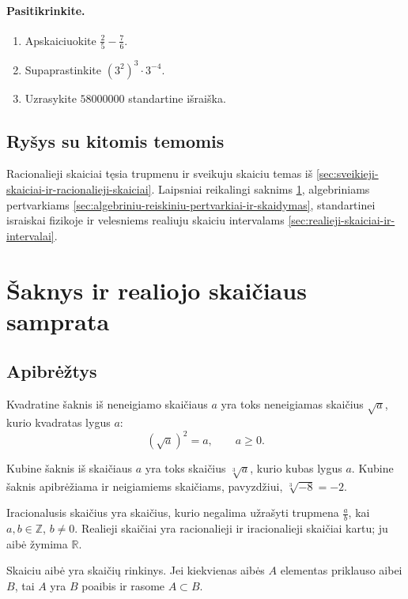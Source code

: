 \paragraph{Pasitikrinkite.}
\begin{enumerate}[label=\alph*)]
\item Apskaiciuokite $\frac25-\frac76$.
\item Supaprastinkite $(3^2)^3\cdot3^{-4}$.
\item Uzrasykite $58000000$ standartine išraiška.
\end{enumerate}

\subsection{Ryšys su kitomis temomis}
Racionalieji skaiciai tęsia trupmenu ir sveikuju skaiciu temas iš \ref{sec:sveikieji-skaiciai-ir-racionalieji-skaiciai}. Laipsniai reikalingi saknims \ref{sec:saknys-ir-realiojo-skaiciaus-samprata}, algebriniams pertvarkiams \ref{sec:algebriniu-reiskiniu-pertvarkiai-ir-skaidymas}, standartinei israiskai fizikoje ir velesniems realiuju skaiciu intervalams \ref{sec:realieji-skaiciai-ir-intervalai}.

\section{Šaknys ir realiojo skaičiaus samprata}\label{sec:saknys-ir-realiojo-skaiciaus-samprata}

\subsection{Apibrėžtys}
\begin{apibreztis}
Kvadratine šaknis iš neneigiamo skaičiaus $a$ yra toks neneigiamas skaičius $\sqrt a$, kurio kvadratas lygus $a$:
\[
(\sqrt a)^2=a,\qquad a\ge0.
\]
\end{apibreztis}
\begin{apibreztis}
Kubine šaknis iš skaičiaus $a$ yra toks skaičius $\sqrt[3]{a}$, kurio kubas lygus $a$. Kubine šaknis apibrėžiama ir neigiamiems skaičiams, pavyzdžiui, $\sqrt[3]{-8}=-2$.
\end{apibreztis}
\begin{apibreztis}
Iracionalusis skaičius yra skaičius, kurio negalima užrašyti trupmena $\frac{a}{b}$, kai $a,b\in\mathbb{Z}$, $b\ne0$. Realieji skaičiai yra racionalieji ir iracionalieji skaičiai kartu; ju aibė žymima $\mathbb{R}$.
\end{apibreztis}
\begin{apibreztis}
Skaiciu aibė yra skaičių rinkinys. Jei kiekvienas aibės $A$ elementas priklauso aibei $B$, tai $A$ yra $B$ poaibis ir rasome $A\subset B$.
\end{apibreztis}

